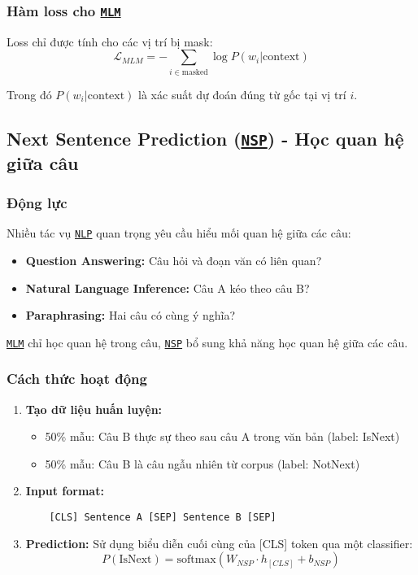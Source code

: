 \subsubsection{Hàm loss cho \hyperref[acro:mlm]{\texttt{MLM}}}
Loss chỉ được tính cho các vị trí bị mask:
$$ \mathcal{L}_{MLM} = -\sum_{i \in \text{masked}} \log P(w_i | \text{context}) $$

Trong đó $P(w_i | \text{context})$ là xác suất dự đoán đúng từ gốc tại vị trí $i$.
\subsection{Next Sentence Prediction (\hyperref[acro:nsp]{\texttt{NSP}}) - Học quan hệ giữa câu}
\label{ssec:nsp}

\subsubsection{Động lực}
Nhiều tác vụ \hyperref[acro:nlp]{\texttt{NLP}} quan trọng yêu cầu hiểu mối quan hệ giữa các câu:
\begin{itemize}
    \item \textbf{Question Answering:} Câu hỏi và đoạn văn có liên quan?
    \item \textbf{Natural Language Inference:} Câu A kéo theo câu B?
    \item \textbf{Paraphrasing:} Hai câu có cùng ý nghĩa?
\end{itemize}

\hyperref[acro:mlm]{\texttt{MLM}} chỉ học quan hệ trong câu, \hyperref[acro:nsp]{\texttt{NSP}} bổ sung khả năng học quan hệ giữa các câu.
\subsubsection{Cách thức hoạt động}
\begin{enumerate}
    \item \textbf{Tạo dữ liệu huấn luyện:}
    \begin{itemize}
        \item 50\% mẫu: Câu B thực sự theo sau câu A trong văn bản (label: IsNext)
        \item 50\% mẫu: Câu B là câu ngẫu nhiên từ corpus (label: NotNext)
    \end{itemize}
    
    \item \textbf{Input format:}
    \begin{verbatim}
    [CLS] Sentence A [SEP] Sentence B [SEP]
    \end{verbatim}
    
    \item
    \textbf{Prediction:} Sử dụng biểu diễn cuối cùng của [CLS] token qua một classifier:
    $$ P(\text{IsNext}) = \text{softmax}(W_{NSP} \cdot h_{[CLS]} + b_{NSP}) $$
\end{enumerate}

